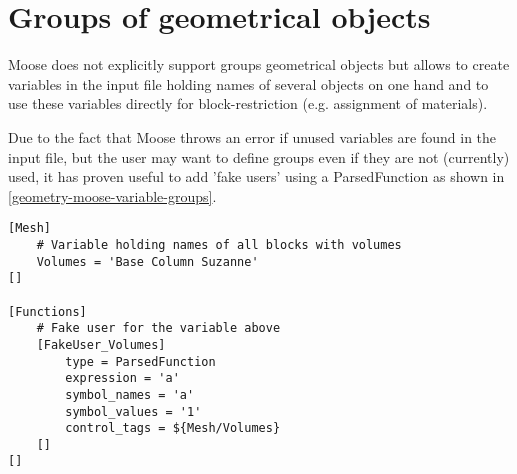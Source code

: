 \section{Groups of geometrical objects}
\label{geometry-groups}

Moose does not explicitly support groups geometrical objects but allows to
create variables in the input file holding names of several objects on one hand
and to use these variables directly for block-restriction (e.g. assignment of
materials).

Due to the fact that Moose throws an error if unused variables are found in the
input file, but the user may want to define groups even if they are not
(currently) used, it has proven useful to add 'fake users' using a
ParsedFunction as shown in \autoref{geometry-moose-variable-groups}.

\begin{lstlisting}[language=Moose, float, caption={Moose input file fragment: variable holding several block names and fake-user},label={geometry-moose-variable-groups}]
[Mesh]
    # Variable holding names of all blocks with volumes
    Volumes = 'Base Column Suzanne'
[]

[Functions]
    # Fake user for the variable above
    [FakeUser_Volumes]
        type = ParsedFunction
        expression = 'a'
        symbol_names = 'a'
        symbol_values = '1'
        control_tags = ${Mesh/Volumes}
    []
[]
\end{lstlisting}

